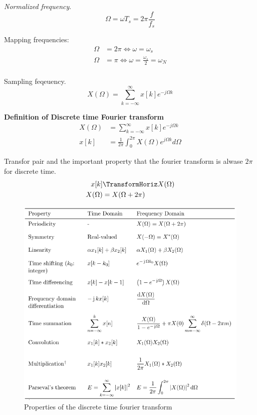 \textit{Normalized frequency}.
\begin{equation*}
    \Omega = \omega T_s = 2\pi\frac{f}{f_s}
\end{equation*}

Mapping frequencies:
\begin{align*}
    \Omega &= 2\pi \Leftrightarrow \omega = \omega_s \\
    \Omega &= \pi \Leftrightarrow \omega = \frac{\omega_s}{2} = \omega_N \\
\end{align*}

Sampling feqeuency.
\begin{equation*}
    X(\Omega) = \sum_{k=-\infty}^{\infty} x[k]e^{-j\Omega k}
\end{equation*}

\newpage
\textbf{Definition of Discrete time Fourier transform}
\begin{align*}
    X(\Omega) &= \sum_{k=-\infty}^{\infty} x[k]e^{-j\Omega k} \\
    x[k] &= \frac{1}{2\pi}\int_0^{2\pi} X(\Omega)e^{j\Omega k} d\Omega
\end{align*}

Transfor pair and the important property that the fourier transform is alwase 
$2\pi$ for discrete time.
\begin{align*}
    x[k] &\TransformHoriz X(\Omega) \\
    X(\Omega) &= X(\Omega + 2\pi) \\
\end{align*}

\begin{figure}[!h]
    \centering
    \includegraphics[width=12cm]{image/properties_discrete_time_fourier_transform.png}
    \caption{Properties of the discrete time fourier transform}
    \label{fig:properties_of_the_discrete_time_fourier_transform}
\end{figure}

